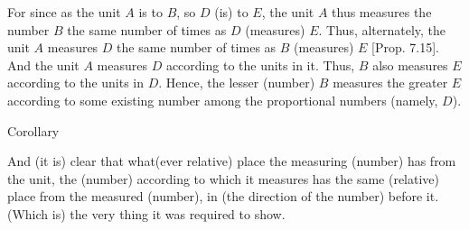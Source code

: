 \begin{Parallel}{}{}
{For since as the unit $A$ is to $B$, so $D$ (is) to $E$,  the unit $A$ thus measures the number $B$ the same number of times as $D$ (measures) $E$. Thus,
alternately, the unit $A$ measures $D$ the same number of times as $B$
(measures) $E$ [Prop. 7.15]. And the unit $A$ measures $D$ according to the units in it. Thus, $B$ also measures $E$ according to the units in $D$. Hence, the lesser (number) $B$
measures the greater $E$ according to some existing number among the
proportional numbers (namely, $D$). \\

\begin{center}
{\large Corollary}
\end{center}\vspace*{-7pt}

And (it is) clear that what(ever relative) place the measuring (number) has from the unit,
the  (number) according to which it measures has the same (relative) place from the measured (number), in (the direction of the number)
before it. (Which is) the very thing it was required to show.}
\end{Parallel}

